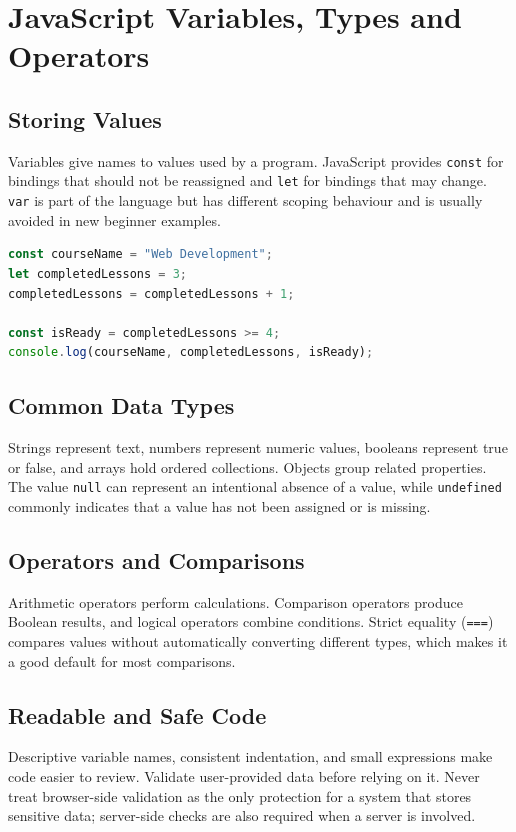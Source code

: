 \documentclass[11pt,openany,oneside]{book}
\begin{document}
\chapter{JavaScript Variables, Types and Operators}
\section{Storing Values}
Variables give names to values used by a program. JavaScript provides \texttt{const} for bindings that should not be reassigned and \texttt{let} for bindings that may change. \texttt{var} is part of the language but has different scoping behaviour and is usually avoided in new beginner examples.

\begin{lstlisting}[style=webcode,language=JavaScript]
const courseName = "Web Development";
let completedLessons = 3;
completedLessons = completedLessons + 1;

const isReady = completedLessons >= 4;
console.log(courseName, completedLessons, isReady);
\end{lstlisting}

\section{Common Data Types}
Strings represent text, numbers represent numeric values, booleans represent true or false, and arrays hold ordered collections. Objects group related properties. The value \texttt{null} can represent an intentional absence of a value, while \texttt{undefined} commonly indicates that a value has not been assigned or is missing.

\section{Operators and Comparisons}
Arithmetic operators perform calculations. Comparison operators produce Boolean results, and logical operators combine conditions. Strict equality (\texttt{===}) compares values without automatically converting different types, which makes it a good default for most comparisons.

\section{Readable and Safe Code}
Descriptive variable names, consistent indentation, and small expressions make code easier to review. Validate user-provided data before relying on it. Never treat browser-side validation as the only protection for a system that stores sensitive data; server-side checks are also required when a server is involved.
\end{document}
